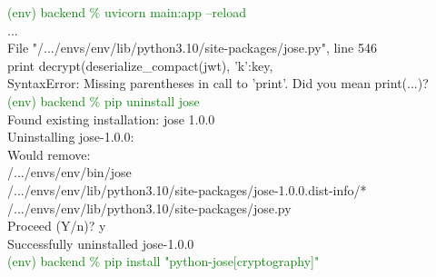 \documentclass[12pt, a4paper]{article}
\begin{document}
        \begin{monoblock}
            \textcolor{green}{(env) backend \% uvicorn main:app --reload} \\
            
              ... \\
              File "/.../envs/env/lib/python3.10/site-packages/jose.py", line 546 \\
            print decrypt(deserialize\_compact(jwt), {'k':key}, \\
            
            SyntaxError: Missing parentheses in call to 'print'. Did you mean print(...)? \\
        
            \textcolor{green}{(env) backend \% pip uninstall jose} \\      
            Found existing installation: jose 1.0.0 \\
            Uninstalling jose-1.0.0: \\
              Would remove: \\
                /.../envs/env/bin/jose \\
                /.../envs/env/lib/python3.10/site-packages/jose-1.0.0.dist-info/* \\
                /.../envs/env/lib/python3.10/site-packages/jose.py \\
            Proceed (Y/n)? y \\
              Successfully uninstalled jose-1.0.0 \\
              
            \textcolor{green}{(env) backend \% pip install "python-jose[cryptography]"} \\
            

\end{monoblock}
\end{document}
